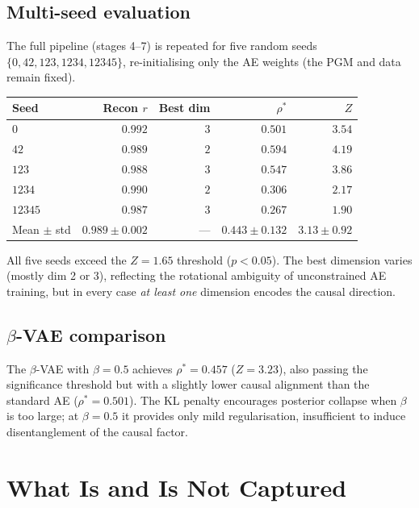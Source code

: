 \documentclass[11pt,a4paper]{article}
\theoremstyle{definition}
\begin{document}
\subsection{Multi-seed evaluation}

The full pipeline (stages 4--7) is repeated for five random seeds
$\{0, 42, 123, 1234, 12345\}$, re-initialising only the AE weights (the
PGM and data remain fixed).

\begin{center}
\begin{tabular}{lrrrr}
\toprule
Seed & Recon $r$ & Best dim & $\rho^*$ & $Z$\\
\midrule
$0$     & $0.992$ & $3$ & $0.501$ & $3.54$\\
$42$    & $0.989$ & $2$ & $0.594$ & $4.19$\\
$123$   & $0.988$ & $3$ & $0.547$ & $3.86$\\
$1234$  & $0.990$ & $2$ & $0.306$ & $2.17$\\
$12345$ & $0.987$ & $3$ & $0.267$ & $1.90$\\
\midrule
Mean $\pm$ std & $0.989 \pm 0.002$
               & ---
               & $0.443 \pm 0.132$
               & $3.13 \pm 0.92$\\
\bottomrule
\end{tabular}
\end{center}

All five seeds exceed the $Z = 1.65$ threshold
($p < 0.05$). The best dimension varies (mostly dim 2 or 3),
reflecting the rotational ambiguity of unconstrained AE training, but
in every case \emph{at least one} dimension encodes the causal
direction.

\subsection{$\beta$-VAE comparison}

The $\beta$-VAE with $\beta = 0.5$ achieves $\rho^* = 0.457$ ($Z = 3.23$),
also passing the significance threshold but with a slightly lower causal
alignment than the standard AE ($\rho^* = 0.501$).  The KL penalty
encourages posterior collapse when $\beta$ is too large; at $\beta = 0.5$
it provides only mild regularisation, insufficient to induce
disentanglement of the causal factor.

\section{What Is and Is Not Captured}
\label{sec:summary}
\end{document}
